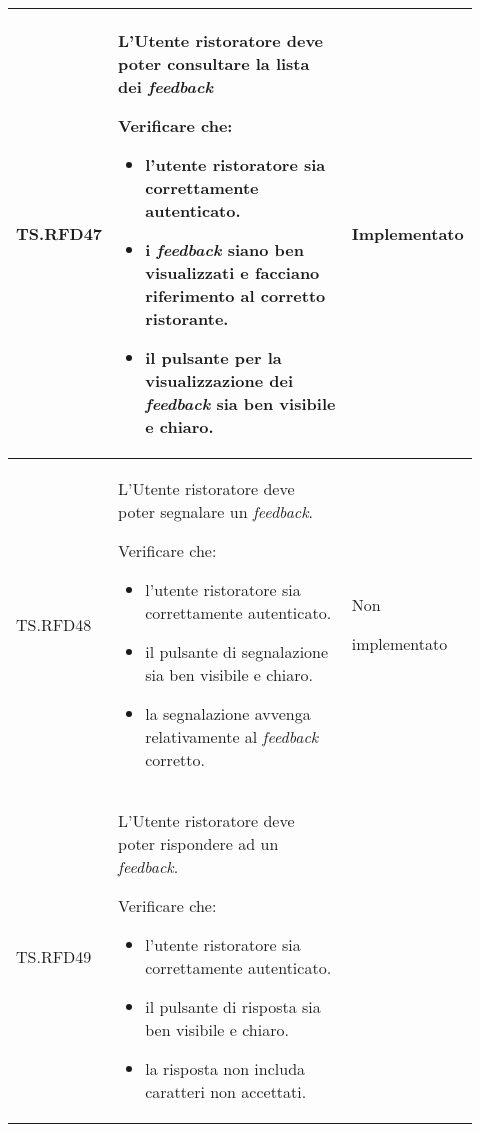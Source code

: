 \begin{longtable}{|p{0.10\linewidth}|p{0.70\linewidth}|p{0.12\linewidth}|}
	\hline
	TS.RFD47                                                                                                                        &
	L'Utente ristoratore deve poter consultare la lista dei \textit{feedback} \par
	Verificare che:
	\begin{itemize}
		\item l'utente ristoratore sia correttamente autenticato.
		\item i \textit{feedback} siano ben visualizzati e facciano riferimento al corretto ristorante.
		\item il pulsante per la visualizzazione dei \textit{feedback} sia ben visibile e chiaro.
	\end{itemize}                                 &
	Implementato                                                                                                                                                            \\
	\hline
	TS.RFD48                                                                                                                        &
	L'Utente ristoratore deve poter segnalare un \textit{feedback}. \par
	Verificare che:
	\begin{itemize}
		\item l'utente ristoratore sia correttamente autenticato.
		\item il pulsante di segnalazione sia ben visibile e chiaro.
		\item la segnalazione avvenga relativamente al \textit{feedback} corretto.
	\end{itemize}                                                      &
	Non \par implementato                                                                                                                                                   \\
	\hline
	TS.RFD49                                                                                                                        &
	L'Utente ristoratore deve poter rispondere ad un \textit{feedback}. \par
	Verificare che:
	\begin{itemize}
		\item l'utente ristoratore sia correttamente autenticato.
		\item il pulsante di risposta sia ben visibile e chiaro.
		\item la risposta non includa caratteri non accettati.

\end{itemize}
\end{longtable}
